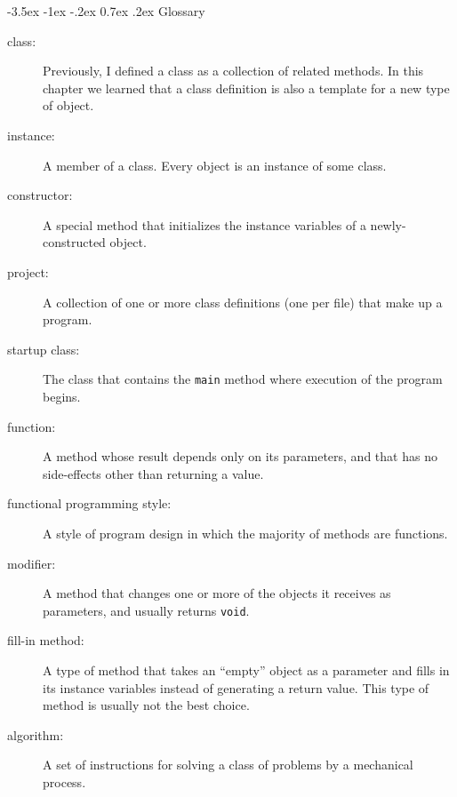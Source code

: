\documentclass{book}
\makeatletter
\renewcommand{\section}{\@startsection 
    {section} {1} {0mm}%
    {-3.5ex \@plus -1ex \@minus -.2ex}%
    {0.7ex \@plus.2ex}%
    {\normalfont\Large\bfseries}}
\makeatother
\begin{document}
\section{Glossary}

\begin{description}

\item[class:]  Previously, I defined a class as a collection
of related methods.  In this chapter we learned that a class
definition is also a template for a new type of object.

\item[instance:]  A member of a class.  Every object is an
instance of some class.

\item[constructor:]  A special method that initializes the instance
variables of a newly-constructed object.

\item[project:]  A collection of one or more class definitions
(one per file) that make up a program.

\item[startup class:]  The class that contains the {\tt main}
method where execution of the program begins.

\item[function:]  A method whose result depends only on its
parameters, and that has no side-effects other than returning
a value.

\item[functional programming style:]  A style of program design
in which the majority of methods are functions.  

\item[modifier:]  A method that changes one or more of the objects
it receives as parameters, and usually returns {\tt void}.

\item[fill-in method:]  A type of method that takes an ``empty''
object as a parameter and fills in its instance variables instead
of generating a return value.  This type of method is usually
not the best choice.

\item[algorithm:]  A set of instructions for solving a class of
problems by a mechanical process.


\end{description}
\end{document}
